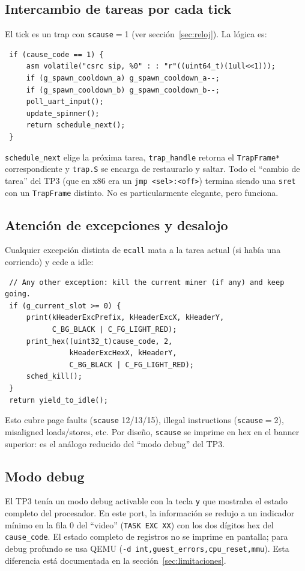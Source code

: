 \subsection{Intercambio de tareas por cada tick}

El tick es un trap con \texttt{scause}$=$1 (ver sección~\ref{sec:reloj}). La lógica es:

\begin{codesnippet}
\begin{verbatim}
 if (cause_code == 1) {
     asm volatile("csrc sip, %0" : : "r"((uint64_t)(1ull<<1)));
     if (g_spawn_cooldown_a) g_spawn_cooldown_a--;
     if (g_spawn_cooldown_b) g_spawn_cooldown_b--;
     poll_uart_input();
     update_spinner();
     return schedule_next();
 }
\end{verbatim}
\end{codesnippet}

\texttt{schedule\_next} elige la próxima tarea, \texttt{trap\_handle} retorna el \texttt{TrapFrame*} correspondiente y
\texttt{trap.S} se encarga de restaurarlo y saltar. Todo el ``cambio de tarea'' del TP3 (que en x86 era un \texttt{jmp
<sel>:<off>}) termina siendo una \texttt{sret} con un \texttt{TrapFrame} distinto. No es particularmente elegante, pero
funciona.

\subsection{Atención de excepciones y desalojo}

Cualquier excepción distinta de \texttt{ecall} mata a la tarea actual (si había una corriendo) y cede a idle:

\begin{codesnippet}
\begin{verbatim}
 // Any other exception: kill the current miner (if any) and keep going.
 if (g_current_slot >= 0) {
     print(kHeaderExcPrefix, kHeaderExcX, kHeaderY,
           C_BG_BLACK | C_FG_LIGHT_RED);
     print_hex((uint32_t)cause_code, 2,
               kHeaderExcHexX, kHeaderY,
               C_BG_BLACK | C_FG_LIGHT_RED);
     sched_kill();
 }
 return yield_to_idle();
\end{verbatim}
\end{codesnippet}

Esto cubre page faults (\texttt{scause} 12/13/15), illegal instructions (\texttt{scause}$=$2), misaligned loads/stores,
etc. Por diseño, \texttt{scause} se imprime en hex en el banner superior: es el análogo reducido del ``modo debug'' del
TP3.

\subsection{Modo debug}

El TP3 tenía un modo debug activable con la tecla \texttt{y} que mostraba el estado completo del procesador. En este
port, la información se redujo a un indicador mínimo en la fila 0 del ``video'' (\texttt{TASK EXC XX}) con los dos
dígitos hex del \texttt{cause\_code}. El estado completo de registros no se imprime en pantalla; para debug profundo se
usa QEMU (\texttt{-d int,guest\_errors,cpu\_reset,mmu}). Esta diferencia está documentada en la
sección~\ref{sec:limitaciones}.
